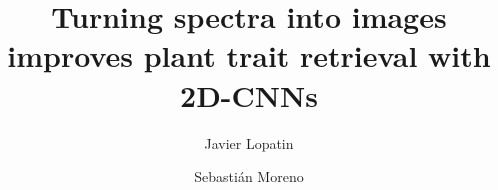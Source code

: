 \documentclass[preprint,12pt]{elsarticle}
\title{Turning spectra into images improves plant trait retrieval with 2D-CNNs}
\author[1,2,3]{Javier Lopatin\corref{cor1}}
\author[1]{Sebastián Moreno}
\begin{document}
\begin{frontmatter}

\end{frontmatter}

\linenumbers

\renewcommand{\thetable}{S\arabic{table}}
\renewcommand{\thefigure}{S\arabic{figure}}




%
%
\end{document}
